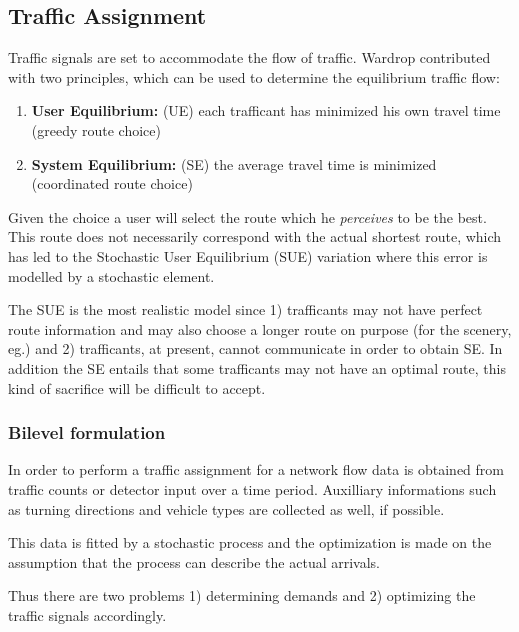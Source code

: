 \subsection{Traffic Assignment}
\label{usereq}
Traffic signals are set to accommodate the flow of traffic. Wardrop contributed with two principles, which can be used to determine the equilibrium traffic flow:

\begin{enumerate}
\item \textbf{User Equilibrium:} (UE) each trafficant has minimized his own travel time (greedy route choice)
\item \textbf{System Equilibrium:} (SE) the average travel time is minimized (coordinated route choice)
\end{enumerate}

Given the choice a user will select the route which he \textit{perceives} to be the best. This route does not necessarily correspond with the actual shortest route, which has led to the Stochastic User Equilibrium (SUE) variation \cite{32} where this error is modelled by a stochastic element. 

The SUE is the most realistic model since 1) trafficants may not have perfect route information and may also choose a longer route on purpose (for the scenery, eg.) and 2) trafficants, at present, cannot communicate in order to obtain SE. In addition the SE entails that some trafficants may not have an optimal route, this kind of sacrifice will be difficult to accept.

\subsubsection*{Bilevel formulation}
\label{bilevel}
In order to perform a traffic assignment for a network flow data is obtained from traffic counts or detector input over a time period. Auxilliary informations such as turning directions and vehicle types are collected as well, if possible. 

This data is fitted by a stochastic process and the optimization is made on the assumption that the process can describe the actual arrivals.

Thus there are two problems 1) determining demands and 2) optimizing the traffic signals accordingly.


